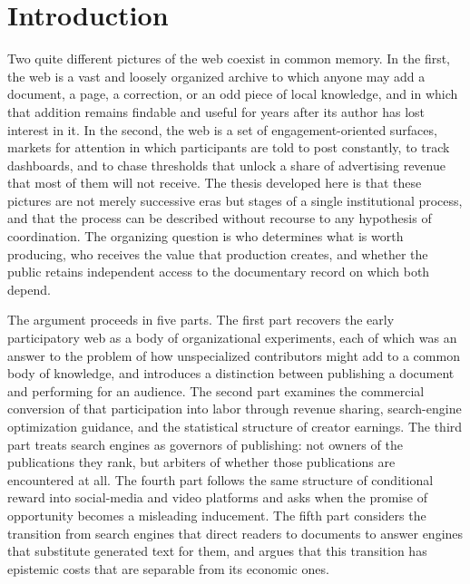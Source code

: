 \documentclass[11pt]{article}
\theoremstyle{remark}
\begin{document}
\newpage

\section*{Introduction}

Two quite different pictures of the web coexist in common memory. In the first, the web is a vast and loosely organized archive to which anyone may add a document, a page, a correction, or an odd piece of local knowledge, and in which that addition remains findable and useful for years after its author has lost interest in it. In the second, the web is a set of engagement-oriented surfaces, markets for attention in which participants are told to post constantly, to track dashboards, and to chase thresholds that unlock a share of advertising revenue that most of them will not receive. The thesis developed here is that these pictures are not merely successive eras but stages of a single institutional process, and that the process can be described without recourse to any hypothesis of coordination. The organizing question is who determines what is worth producing, who receives the value that production creates, and whether the public retains independent access to the documentary record on which both depend.

The argument proceeds in five parts. The first part recovers the early participatory web as a body of organizational experiments, each of which was an answer to the problem of how unspecialized contributors might add to a common body of knowledge, and introduces a distinction between publishing a document and performing for an audience. The second part examines the commercial conversion of that participation into labor through revenue sharing, search-engine optimization guidance, and the statistical structure of creator earnings. The third part treats search engines as governors of publishing: not owners of the publications they rank, but arbiters of whether those publications are encountered at all. The fourth part follows the same structure of conditional reward into social-media and video platforms and asks when the promise of opportunity becomes a misleading inducement. The fifth part considers the transition from search engines that direct readers to documents to answer engines that substitute generated text for them, and argues that this transition has epistemic costs that are separable from its economic ones.
\end{document}
